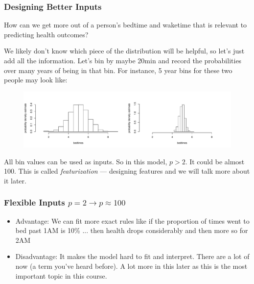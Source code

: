 \documentclass[slides]{beamer} %
\begin{document}
\begin{frame}\frametitle{Designing Better Inputs}

\small
How can we get more  out of a person's bedtime and waketime that is relevant to predicting health outcomes? \pause 

We likely don't know which piece of the distribution will be helpful, so let's just add all the information. Let's bin by maybe 20min and record the probabilities over many years of being in that bin. For instance, 5 year bins for these two people may look like:

%	
\vspace{-0.2cm}
\begin{figure}
\centering
\includegraphics[width=4.5in]{two_hists}
\end{figure}

All bin values can be used as inputs. So in this model, $p > 2$. It could be almost 100. This is called \emph{featurization} --- designing features and we will talk more about it later.

\end{frame}

\begin{frame}\frametitle{Flexible Inputs $p=2 \rightarrow p \approx 100$}

\begin{itemize}
\item Advantage: We can fit more exact rules like if the proportion of times went to bed past 1AM is 10\% ... then health drops considerably and then more so for 2AM \pause 
\item Disadvantage: It makes the model hard to fit and interpret. There are a lot of  now (a term you've heard before). A lot more in this later as this is the most important topic in this course.
\end{itemize}

\end{frame}
\end{document}
